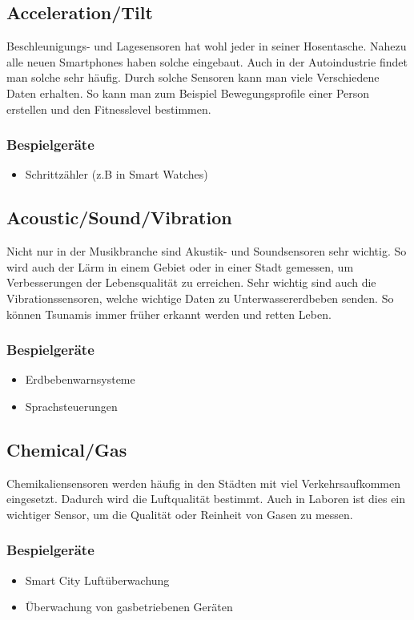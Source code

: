\subsection{Acceleration/Tilt}%
Beschleunigungs- und Lagesensoren hat wohl jeder in seiner Hosentasche. Nahezu alle neuen Smartphones haben solche eingebaut. Auch in der Autoindustrie findet man solche sehr häufig. Durch solche Sensoren kann man viele Verschiedene Daten erhalten. So kann man zum Beispiel Bewegungsprofile einer Person erstellen und den Fitnesslevel bestimmen.
\subsubsection{Bespielgeräte}
\begin{itemize}
\item	Schrittzähler (z.B in Smart Watches)
\end{itemize}


\subsection{Acoustic/Sound/Vibration}%
Nicht nur in der Musikbranche sind Akustik- und Soundsensoren sehr wichtig. So wird auch der Lärm in einem Gebiet oder in einer Stadt gemessen, um Verbesserungen der Lebensqualität zu erreichen. Sehr wichtig sind auch die Vibrationssensoren, welche wichtige Daten zu Unterwassererdbeben senden. So können Tsunamis immer früher erkannt werden und retten Leben.
\subsubsection{Bespielgeräte}
\begin{itemize}
\item	Erdbebenwarnsysteme
\item	Sprachsteuerungen
\end{itemize}


\subsection{Chemical/Gas}%
Chemikaliensensoren werden häufig in den Städten mit viel Verkehrsaufkommen eingesetzt. Dadurch wird die Luftqualität bestimmt. Auch in Laboren ist dies ein wichtiger Sensor, um die Qualität oder Reinheit von Gasen zu messen.
\subsubsection{Bespielgeräte}
\begin{itemize}
\item	Smart City Luftüberwachung
\item	Überwachung von gasbetriebenen Geräten
\end{itemize}


